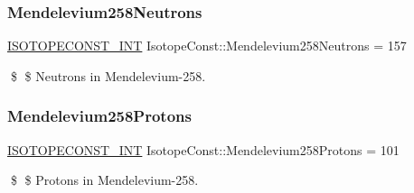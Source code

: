 \subsubsection{\texorpdfstring{Mendelevium258\+Neutrons}{Mendelevium258Neutrons}}
{\footnotesize\ttfamily \mbox{\hyperlink{group___isotope_const-_macros_ga5f18360b3e99483a35c32d789e62621c}{I\+S\+O\+T\+O\+P\+E\+C\+O\+N\+S\+T\+\_\+\+I\+NT}} Isotope\+Const\+::\+Mendelevium258\+Neutrons = 157}

\$ \$ Neutrons in Mendelevium-\/258. \mbox{\label{group___isotope_const-_mendelevium-_md258_ga46f456a023bdae59ea30908c3a034302}} 
\subsubsection{\texorpdfstring{Mendelevium258\+Protons}{Mendelevium258Protons}}
{\footnotesize\ttfamily \mbox{\hyperlink{group___isotope_const-_macros_ga5f18360b3e99483a35c32d789e62621c}{I\+S\+O\+T\+O\+P\+E\+C\+O\+N\+S\+T\+\_\+\+I\+NT}} Isotope\+Const\+::\+Mendelevium258\+Protons = 101}

\$ \$ Protons in Mendelevium-\/258. 